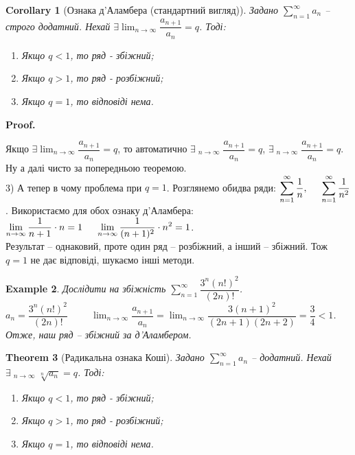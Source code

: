\documentclass[a4paper, 10pt]{article}
\makeatletter
\DeclareMathOperator*\uplim{\overline{lim}}
\DeclareMathOperator*\downlim{\underline{lim}}
\def\huge{\displaystyle}
\def\qed{$\blacksquare$}
\theoremstyle{theoremdd}
\newtheorem{theorem}{Theorem}[subsection]
\theoremstyle{theoremdd}
\theoremstyle{theoremdd}
\theoremstyle{theoremdd}
\theoremstyle{theoremdd}
\newtheorem{example}[theorem]{Example}
\theoremstyle{theoremdd}
\theoremstyle{theoremdd}
\theoremstyle{theoremdd}
\theoremstyle{theoremdd}
\newtheorem{corollary}[theorem]{Corollary}
\renewenvironment{proof}[1][Proof.\\]{\par
\pushQED{\hfill \qed}%
\normalfont \topsep6\p@\@plus6\p@\relax
\trivlist
\item\relax
{\bfseries
#1\@addpunct{.}}\hspace\labelsep\ignorespaces
}{%
\popQED\endtrivlist\@endpefalse
}
\makeatother
\begin{document}
\begin{corollary}[Ознака д'Аламбера (стандартний вигляд)]
Задано $\huge \sum_{n=1}^{\infty} a_n$ -- строго додатний. Нехай $\exists \huge \lim_{n \to \infty} \dfrac{a_{n+1}}{a_n} = q$. Тоді:
\begin{enumerate}[nosep,wide=0pt,label={\arabic*)}]
\item Якщо $q<1$, то ряд - збіжний;
\item Якщо $q>1$, то ряд - розбіжний;
\item Якщо $q=1$, то відповіді нема.
\end{enumerate}
\end{corollary}

\begin{proof}
Якщо $\exists \huge\lim_{n \to \infty} \dfrac{a_{n+1}}{a_n} = q$, то автоматично $\exists \huge\uplim_{n \to \infty} \dfrac{a_{n+1}}{a_n} = q$, $\exists \huge\downlim_{n \to \infty} \dfrac{a_{n+1}}{a_n} = q$. Ну а далі чисто за попередньою теоремою.
\bigskip \\
3) А тепер в чому проблема при $q = 1$. Розглянемо обидва ряди: $\huge \sum_{n=1}^\infty \dfrac{1}{n}, \hspace{0.5cm} \sum_{n=1}^\infty \dfrac{1}{n^2}$.
Використаємо для обох ознаку д'Аламбера:\\
$\huge \lim_{n \to \infty} \dfrac{1}{n+1} \cdot n = 1 \hspace{0.5cm} \lim_{n \to \infty} \dfrac{1}{(n+1)^2} \cdot n^2 = 1$.\\
Результат -- однаковий, проте один ряд -- розбіжний, а інший -- збіжний. Тож $q = 1$ не дає відповіді, шукаємо інші методи.
\end{proof}

\begin{example}
Дослідити на збіжність $\huge\sum_{n=1}^\infty \dfrac{3^n (n!)^2}{(2n)!}$.\\
$a_n = \dfrac{3^n (n!)^2}{(2n)!} \hspace{1cm} \huge\lim_{n \to \infty} \dfrac{a_{n+1}}{a_n} = \lim_{n \to \infty} \dfrac{3 (n+1)^2}{(2n+1)(2n+2)} = \dfrac{3}{4} < 1$.\\
Отже, наш ряд -- збіжний за д'Аламбером.
\end{example}

\begin{theorem}[Радикальна ознака Коші]
Задано $\huge \sum_{n=1}^{\infty} a_n$ -- додатний. Нехай $\exists \huge \uplim_{n \to \infty} \sqrt[n]{a_n} = q$. Тоді:
\begin{enumerate}[nosep,wide=0pt,label={\arabic*)}]
\item Якщо $q<1$, то ряд - збіжний;
\item Якщо $q>1$, то ряд - розбіжний;
\item Якщо $q=1$, то відповіді нема.
\end{enumerate}
\end{theorem}
\end{document}
